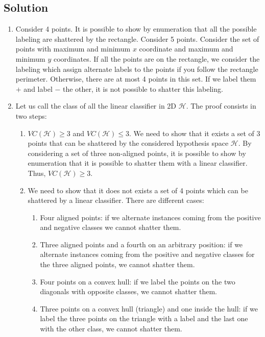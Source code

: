 \subsection*{Solution}
\begin{enumerate}
    \item Consider 4 points. 
        It is possible to show by enumeration that all the possible labeling are shattered by the rectangle. 
        Consider 5 points. 
        Consider the set of points with maximum and minimum $x$ coordinate and maximum and minimum $y$ coordinates. 
        If all the points are on the rectangle, we consider the labeling which assign alternate labels to the points if you follow the rectangle perimeter. 
        Otherwise, there are at most 4 points in this set. 
        If we label them $+$ and label $-$ the other, it is not possible to shatter this labeling.
    \item Let us call the class of all the linear classifier in 2D $\mathcal{H}$. 
        The proof consists in two steps: 
        \begin{enumerate}
            \item $V C(\mathcal{H}) \geq 3$ and $V C(\mathcal{H}) \leq 3$. 
                We need to show that it exists a set of 3 points that can be shattered by the considered hypothesis space $\mathcal{H}$. 
                By considering a set of three non-aligned points, it is possible to show by enumeration that it is possible to shatter them with a linear classifier. 
                Thus, $V C(\mathcal{H}) \geq 3$. 
            \item We need to show that it does not exists a set of 4 points which can be shattered by a linear classifier. 
                There are different cases:
                \begin{enumerate}
                    \item Four aligned points: if we alternate instances coming from the positive and negative classes we cannot shatter them.
                    \item Three aligned points and a fourth on an arbitrary position: if we alternate instances coming from the positive and negative classes for the three aligned points, we cannot shatter them.
                    \item Four points on a convex hull: if we label the points on the two diagonals with opposite classes, we cannot shatter them.
                    \item Three points on a convex hull (triangle) and one inside the hull: if we label the three points on the triangle with a label and the last one with the other class, we cannot shatter them.

\end{enumerate}
\end{enumerate}
\end{enumerate}
